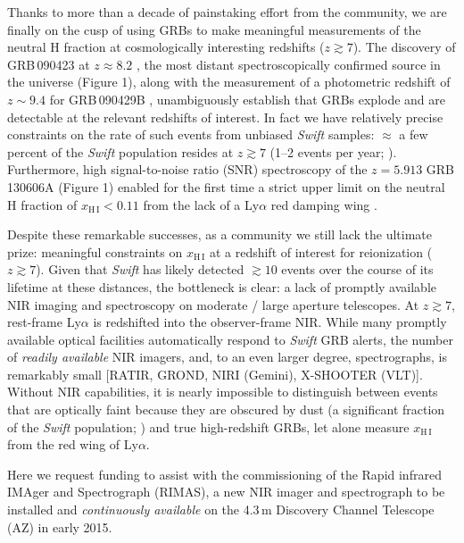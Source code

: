 \documentclass[letterpaper,11pt]{article}
\begin{document}
Thanks to more than a decade of painstaking effort from the community, we are finally
on the cusp of using GRBs to make meaningful measurements of the neutral H fraction 
at cosmologically interesting redshifts ($z \gtrsim 7$).  The discovery of 
GRB\,090423 at $z \approx 8.2$ \cite{tfl+09,sdc+09}, the most distant 
spectroscopically confirmed source in the universe (Figure 1), along with the 
measurement of a
photometric redshift of $z \sim 9.4$ for GRB\,090429B \cite{clf+11}, unambiguously
establish that GRBs explode and are detectable at the relevant redshifts of 
interest.  In fact we have relatively precise constraints 
on the rate of such events from unbiased \textit{Swift} samples: $\approx$ a few
percent of the \textit{Swift} population resides at $z \gtrsim 7$ (1--2 events per
year; \cite{pcb+09,gkk+11}).  Furthermore, high signal-to-noise ratio (SNR) 
spectroscopy of the $z = 5.913$ GRB\,130606A (Figure 1) enabled for the first time a 
strict upper limit on the neutral H fraction of $x_{\mathrm{H\,I}} < 0.11$ from 
the lack of a Ly$\alpha$ red damping wing \cite{cbf+13}.

Despite these remarkable successes, as a community we still lack the ultimate
prize: meaningful constraints on $x_{\mathrm{H\,I}}$ at a redshift of interest
for reionization ($z \gtrsim 7$).  Given that \textit{Swift} has likely detected
$\gtrsim 10$ events over the course of its lifetime at these distances, the
bottleneck is clear: a lack of promptly available NIR imaging and spectroscopy 
on moderate / large aperture telescopes.  At $z \gtrsim 7$, rest-frame Ly$\alpha$
is redshifted into the observer-frame NIR.  While many promptly available 
optical facilities automatically respond to \textit{Swift} GRB alerts, the number
of \textit{readily available} NIR imagers, and, to an even larger degree,
spectrographs, is remarkably small [RATIR, GROND, NIRI (Gemini), X-SHOOTER (VLT)].
Without NIR capabilities, it is nearly impossible to distinguish between events
that are optically faint because they are obscured by dust (a significant fraction
of the \textit{Swift} population; \cite{ckh+09,pcb+09,gkk+11}) and true
high-redshift GRBs, let alone measure $x_{\mathrm{H\,I}}$ from the red wing of
Ly$\alpha$.

Here we request funding to assist with the commissioning of the Rapid infrared
IMAger and Spectrograph (RIMAS), a new NIR imager and spectrograph to be installed and 
\textit{continuously available} on the 4.3\,m Discovery Channel Telescope (AZ) in early 
2015.

\smallskip
\end{document}

